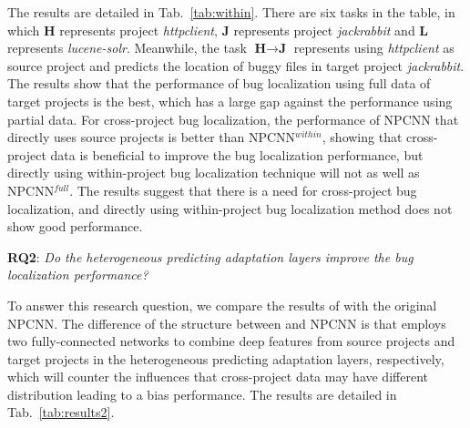 The results are detailed in Tab.~\ref{tab:within}. There are six tasks in the table, in which $\textbf{H}$ represents project \textit{httpclient}, $\textbf{J}$ represents project \textit{jackrabbit} and $\textbf{L}$ represents \textit{lucene-solr}. Meanwhile, the task $\textbf{H} \rightarrow \textbf{J}$ represents using \textit{httpclient} as source project and predicts the location of buggy files in target project \textit{jackrabbit}. The results show that the performance of bug localization using full data of target projects is the best, which has a large gap against the performance using partial data. For cross-project bug localization, the performance of NPCNN that directly uses source projects is better than NPCNN$^{within}$, showing that cross-project data is beneficial to improve the bug localization performance, but directly using within-project bug localization technique will not as well as NPCNN$^{full}$. The results suggest that there is a need for cross-project bug localization, and directly using within-project bug localization method does not show good performance.

\textbf{RQ2}: \textit{Do the heterogeneous predicting adaptation layers improve the bug localization performance?}

To answer this research question, we compare the results of \TRANPCNN with the original NPCNN. The difference of the structure between \TRANPCNN and NPCNN is that \TRANPCNN employs two fully-connected networks to combine deep features from source projects and target projects in the heterogeneous predicting adaptation layers, respectively, which will counter the influences that cross-project data may have different distribution leading to a bias performance. The results are detailed in Tab.~\ref{tab:results2}.


